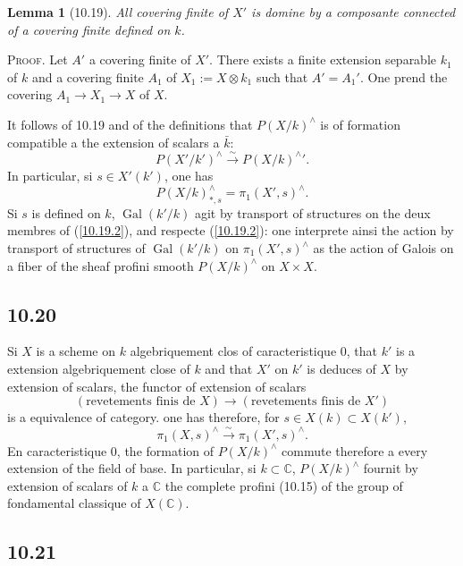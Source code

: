 \documentclass[12pt,a4paper]{article}
\theoremstyle{plain}
\newtheorem{lemma}[theorem]{Lemma}
\theoremstyle{definition}
\theoremstyle{remark}
\DeclareMathOperator{\Gal}{Gal}
\newcommand{\C}{\mathbb{C}}
\begin{document}
\begin{lemma}[10.19]
All covering finite of $X'$ is domine by a composante connected of a covering finite defined on $k$.
\end{lemma}

\textsc{Proof.} Let $A'$ a covering finite of $X'$. There exists a finite extension separable $k_1$ of $k$ and a covering finite $A_1$ of $X_1 := X \otimes k_1$ such that $A' = A_1'$. One prend the covering $A_1 \to X_1 \to X$ of $X$.

It follows of 10.19 and of the definitions that $P(X/k)^\wedge$ is of formation compatible a the extension of scalars a $\bar{k}$:
\begin{equation}\label{10.19.1}
P(X'/k')^\wedge \xrightarrow{\sim} {P(X/k)^\wedge}'. \tag{10.19.1}
\end{equation}
In particular, si $s \in X'(k')$, one has
\begin{equation}\label{10.19.2}
P(X/k)^\wedge_{*, s} = \pi_1(X', s)^\wedge. \tag{10.19.2}
\end{equation}
Si $s$ is defined on $k$, $\Gal(k'/k)$ agit by transport of structures on the deux membres of (\ref{10.19.2}), and respecte (\ref{10.19.2}): one interprete ainsi the action by transport of structures of $\Gal(k'/k)$ on $\pi_1(X', s)^\wedge$ as the action of Galois on a fiber of the sheaf profini smooth $P(X/k)^\wedge$ on $X \times X$.

\subsection*{10.20}

Si $X$ is a scheme on $k$ algebriquement clos of caracteristique 0, that $k'$ is a extension algebriquement close of $k$ and that $X'$ on $k'$ is deduces of $X$ by extension of scalars, the functor of extension of scalars
$$(\text{revetements finis de } X) \longrightarrow (\text{revetements finis de } X')$$
is a equivalence of category. one has therefore, for $s \in X(k) \subset X(k')$,
$$\pi_1(X, s)^\wedge \xrightarrow{\sim} \pi_1(X', s)^\wedge.$$
En caracteristique 0, the formation of $P(X/k)^\wedge$ commute therefore a every extension of the field of base. In particular, si $k \subset \C$, $P(X/k)^\wedge$ fournit by extension of scalars of $k$ a $\C$ the complete profini (10.15) of the group of fondamental classique of $X(\C)$.

\subsection*{10.21}
\end{document}
